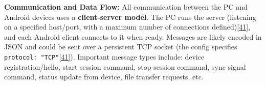 \documentclass[12pt,a4paper]{article}
\begin{document}
\textbf{Communication and Data Flow:} All communication between the PC and Android devices uses a \textbf{client-server model}. The PC runs the server (listening on a specified host/port, with a maximum number of connections defined)\href{https://github.com/buccancs/bucika_gsr/blob/7048f7f6a7536f5cd577ed2184800d3dad97fd08/protocol/config.json\#L6-L14}{{[}41{]}}, and each Android client connects to it when ready. Messages are likely encoded in JSON and could be sent over a persistent TCP socket (the config specifies \passthrough{\lstinline!protocol: "TCP"!}\href{https://github.com/buccancs/bucika_gsr/blob/7048f7f6a7536f5cd577ed2184800d3dad97fd08/protocol/config.json\#L6-L14}{{[}41{]}}). Important message types include: device registration/hello, start session command, stop session command, sync signal command, status update from device, file transfer requests, etc.
\end{document}
